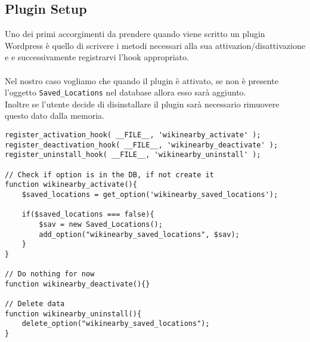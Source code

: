 \subsection*{Plugin Setup}
Uno dei primi accorgimenti da prendere quando viene scritto un plugin Wordpress è quello di scrivere i metodi necessari alla sua attivazion/disattivazione e e successivamente registrarvi l'hook \cite{hooks} appropriato.\\\\
Nel nostro caso  vogliamo che quando il plugin è attivato, se non è presente l'oggetto \texttt{Saved\_Locations} nel database allora esso sarà aggiunto. \\
Inoltre se l'utente decide di disinstallare il plugin sarà necessario rimuovere questo dato dalla memoria.\\
\begin{lstlisting}
register_activation_hook( __FILE__, 'wikinearby_activate' );
register_deactivation_hook( __FILE__, 'wikinearby_deactivate' );
register_uninstall_hook( __FILE__, 'wikinearby_uninstall' );

// Check if option is in the DB, if not create it
function wikinearby_activate(){
    $saved_locations = get_option('wikinearby_saved_locations');
	
    if($saved_locations === false){
        $sav = new Saved_Locations();
		add_option("wikinearby_saved_locations", $sav);
	}
}

// Do nothing for now
function wikinearby_deactivate(){}

// Delete data
function wikinearby_uninstall(){
	delete_option("wikinearby_saved_locations");
}
\end{lstlisting}

